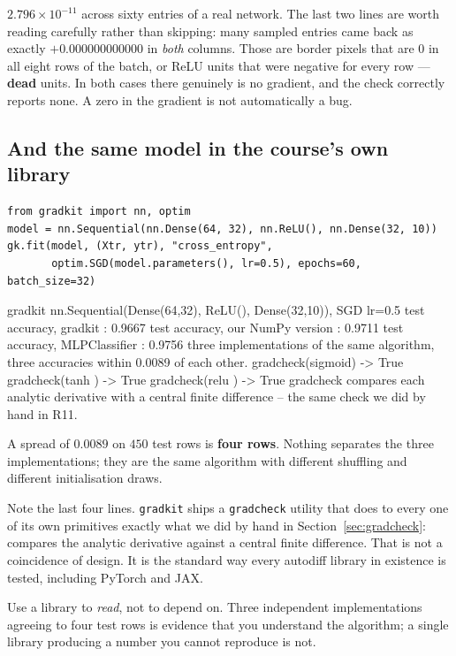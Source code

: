 \documentclass[11pt]{article}
\begin{document}
$2.796\times10^{-11}$ across sixty entries of a real network. The last two
lines are worth reading carefully rather than skipping: many sampled entries
came back as exactly $+0.000000000000$ in \emph{both} columns. Those are
border pixels that are $0$ in all eight rows of the batch, or ReLU units that
were negative for every row --- \textbf{dead} units. In both cases there
genuinely is no gradient, and the check correctly reports none. A zero in the
gradient is not automatically a bug.

\subsection{And the same model in the course's own library}

\begin{lstlisting}
from gradkit import nn, optim
model = nn.Sequential(nn.Dense(64, 32), nn.ReLU(), nn.Dense(32, 10))
gk.fit(model, (Xtr, ytr), "cross_entropy",
       optim.SGD(model.parameters(), lr=0.5), epochs=60, batch_size=32)
\end{lstlisting}
\begin{codeout}
gradkit nn.Sequential(Dense(64,32), ReLU(), Dense(32,10)), SGD lr=0.5
   test accuracy, gradkit           : 0.9667
   test accuracy, our NumPy version : 0.9711
   test accuracy, MLPClassifier     : 0.9756
three implementations of the same algorithm, three accuracies within
   0.0089 of each other.
   gradcheck(sigmoid) -> True
   gradcheck(tanh   ) -> True
   gradcheck(relu   ) -> True
   gradcheck compares each analytic derivative with a central
   finite difference -- the same check we did by hand in R11.
\end{codeout}

A spread of $0.0089$ on $450$ test rows is \textbf{four rows}. Nothing
separates the three implementations; they are the same algorithm with
different shuffling and different initialisation draws.

Note the last four lines. \texttt{gradkit} ships a \texttt{gradcheck} utility
that does to every one of its own primitives exactly what we did by hand in
Section~\ref{sec:gradcheck}: compares the analytic derivative against a
central finite difference. That is not a coincidence of design. It is the
standard way every autodiff library in existence is tested, including PyTorch
and JAX.

\begin{keyidea}
Use a library to \emph{read}, not to depend on. Three independent
implementations agreeing to four test rows is evidence that you understand the
algorithm; a single library producing a number you cannot reproduce is not.
\end{keyidea}
\end{document}
